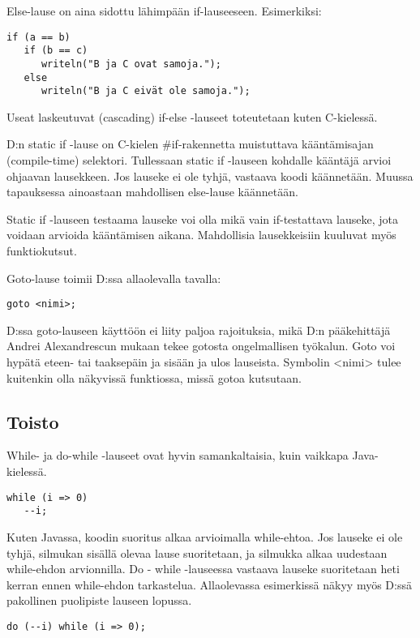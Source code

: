\documentclass[11pt,oneside,a4paper]{article}
\begin{document}
Else-lause on aina sidottu lähimpään if-lauseeseen. Esimerkiksi:

\begin{verbatim}
if (a == b)
   if (b == c)
      writeln("B ja C ovat samoja.");
   else
      writeln("B ja C eivät ole samoja.");
\end{verbatim}

Useat laskeutuvat (cascading) if-else -lauseet toteutetaan kuten C-kielessä.


D:n static if -lause on C-kielen \#if-rakennetta muistuttava kääntämisajan
(compile-time) selektori. Tullessaan static if -lauseen kohdalle kääntäjä arvioi
ohjaavan lausekkeen. Jos lauseke ei ole tyhjä, vastaava koodi käännetään. Muussa
tapauksessa ainoastaan mahdollisen else-lause käännetään. 

Static if -lauseen testaama lauseke voi olla mikä vain if-testattava lauseke,
jota voidaan arvioida kääntämisen aikana. Mahdollisia lausekkeisiin kuuluvat
myös funktiokutsut.

Goto-lause toimii D:ssa allaolevalla tavalla:

\begin{verbatim}
goto <nimi>;
\end{verbatim}

D:ssa goto-lauseen käyttöön ei liity paljoa rajoituksia, mikä D:n pääkehittäjä
Andrei Alexandrescun mukaan tekee gotosta ongelmallisen työkalun. Goto voi
hypätä eteen- tai taaksepäin ja sisään ja ulos lauseista. Symbolin <nimi> tulee
kuitenkin olla näkyvissä funktiossa, missä gotoa kutsutaan. 


\subsection{Toisto}

While- ja do-while -lauseet ovat hyvin samankaltaisia, kuin vaikkapa
Java-kielessä. 

\begin{verbatim}
while (i => 0)
   --i;
\end{verbatim}

Kuten Javassa, koodin suoritus alkaa arvioimalla while-ehtoa. Jos lauseke ei ole
tyhjä, silmukan sisällä olevaa lause suoritetaan, ja silmukka alkaa uudestaan
while-ehdon arvionnilla. Do - while -lauseessa vastaava lauseke suoritetaan heti
kerran ennen while-ehdon tarkastelua. Allaolevassa esimerkissä näkyy myös D:ssä
pakollinen puolipiste lauseen lopussa.

\begin{verbatim}
do (--i) while (i => 0);
\end{verbatim}
\end{document}
